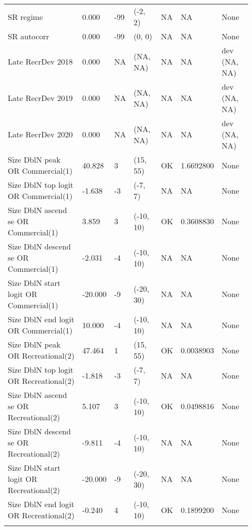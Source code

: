 \documentclass[11pt,
  english,
  a4paper,
]{article}
\begin{document}
\begin{landscape}
\begin{longtable}[t]{>{\raggedright\arraybackslash}p{6cm}lllll>{\raggedright\arraybackslash}p{4cm}}
SR regime & 0.000 & -99 & (-2, 2) & NA & NA & None\\
SR autocorr & 0.000 & -99 & (0, 0) & NA & NA & None\\
Late RecrDev 2018 & 0.000 & NA & (NA, NA) & NA & NA & dev (NA, NA)\\
Late RecrDev 2019 & 0.000 & NA & (NA, NA) & NA & NA & dev (NA, NA)\\
Late RecrDev 2020 & 0.000 & NA & (NA, NA) & NA & NA & dev (NA, NA)\\
Size DblN peak OR Commercial(1) & 40.828 & 3 & (15, 55) & OK & 1.6692800 & None\\
Size DblN top logit OR Commercial(1) & -1.638 & -3 & (-7, 7) & NA & NA & None\\
Size DblN ascend se OR Commercial(1) & 3.859 & 3 & (-10, 10) & OK & 0.3608830 & None\\
Size DblN descend se OR Commercial(1) & -2.031 & -4 & (-10, 10) & NA & NA & None\\
Size DblN start logit OR Commercial(1) & -20.000 & -9 & (-20, 30) & NA & NA & None\\
Size DblN end logit OR Commercial(1) & 10.000 & -4 & (-10, 10) & NA & NA & None\\
Size DblN peak OR Recreational(2) & 47.464 & 1 & (15, 55) & OK & 0.0038903 & None\\
Size DblN top logit OR Recreational(2) & -1.818 & -3 & (-7, 7) & NA & NA & None\\
Size DblN ascend se OR Recreational(2) & 5.107 & 3 & (-10, 10) & OK & 0.0498816 & None\\
Size DblN descend se OR Recreational(2) & -9.811 & -4 & (-10, 10) & NA & NA & None\\
Size DblN start logit OR Recreational(2) & -20.000 & -9 & (-20, 30) & NA & NA & None\\
Size DblN end logit OR Recreational(2) & -0.240 & 4 & (-10, 10) & OK & 0.1899200 & None\\*
\end{longtable}
\endgroup{}
\end{landscape}
\endgroup{}





\newpage



\newpage
\end{document}
